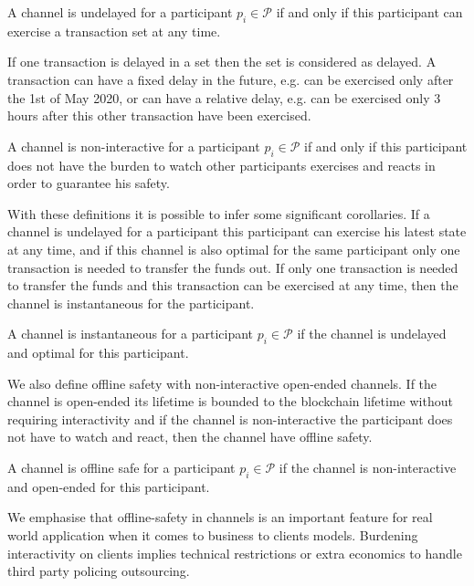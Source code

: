 \documentclass{llncs}
\begin{document}
\begin{definition}[Undelayed] A channel is undelayed for a participant $p_i \in \mathcal{P}$ if and only if this participant can exercise a transaction set at any time.
\end{definition}

If one transaction is delayed in a set then the set is considered as delayed. A transaction can have a fixed delay in the future, e.g. can be exercised only after the 1st of May 2020, or can have a relative delay, e.g. can be exercised only 3 hours after this other transaction have been exercised.

\begin{definition} A channel is non-interactive for a participant $p_i \in \mathcal{P}$ if and only if this participant does not have the burden to watch other participants exercises and reacts in order to guarantee his safety.
\end{definition}

With these definitions it is possible to infer some significant corollaries. If a channel is undelayed for a participant this participant can exercise his latest state at any time, and if this channel is also optimal for the same participant only one transaction is needed to transfer the funds out. If only one transaction is needed to transfer the funds and this transaction can be exercised at any time, then the channel is instantaneous for the participant.

\begin{corollary}[Instantaneous] A channel is instantaneous for a participant $p_i \in \mathcal{P}$ if the channel is undelayed and optimal for this participant.
\end{corollary}

We also define offline safety with non-interactive open-ended channels. If the channel is open-ended its lifetime is bounded to the blockchain lifetime without requiring interactivity and if the channel is non-interactive the participant does not have to watch and react, then the channel have offline safety.

\begin{corollary} A channel is offline safe for a participant $p_i \in \mathcal{P}$ if the channel is non-interactive and open-ended for this participant.
\end{corollary}

We emphasise that offline-safety in channels is an important feature for real world application when it comes to business to clients models. Burdening interactivity on clients implies technical restrictions or extra economics to handle third party policing outsourcing.
\end{document}
